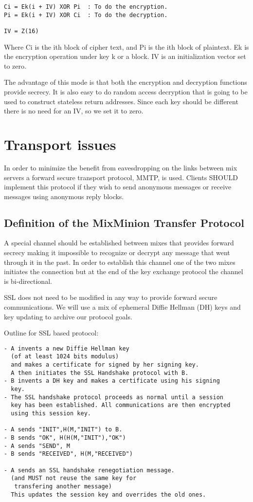 \documentclass{article}
\begin{document}
\begin{verbatim}
Ci = Ek(i + IV) XOR Pi  : To do the encryption.
Pi = Ek(i + IV) XOR Ci  : To do the decryption.

IV = Z(16)
\end{verbatim}

Where Ci is the ith block of cipher text, and Pi is the ith block of
plaintext. Ek is the encryption operation under key k or a block. IV
is an initialization vector set to zero.

The advantage of this mode is that both the encryption and decryption
functions provide secrecy. It is also easy to do random access
decryption that is going to be used to construct stateless return
addresses. Since each key should be different there is no need for an
IV, so we set it to zero. 

\section{Transport issues}

In order to minimize the benefit from eavesdropping on the links 
between mix servers a forward secure transport protocol, MMTP, is used. 
Clients SHOULD implement this protocol if they wish to send anonymous 
messages or receive messages using anonymous reply blocks.

\subsection{Definition of the MixMinion Transfer Protocol}

A special channel should be established between mixes that provides
forward secrecy making it impossible to recognize or decrypt any
message that went through it in the past. In order to establish this
channel one of the two mixes initiates the connection but at the end
of the key exchange protocol the channel is bi-directional.

SSL does not need to be modified in any way to provide forward secure
communications. We will use a mix of ephemeral Diffie Hellman (DH)
keys and key updating to archive our protocol goals.

Outline for SSL based protocol:

\begin{verbatim}
- A invents a new Diffie Hellman key 
  (of at least 1024 bits modulus)
  and makes a certificate for signed by her signing key.
  A then initiates the SSL Handshake protocol with B.
- B invents a DH key and makes a certificate using his signing
  key.
- The SSL handshake protocol proceeds as normal until a session
  key has been established. All communications are then encrypted
  using this session key.

- A sends "INIT",H(M,"INIT") to B.
- B sends "OK", H(H(M,"INIT"),"OK")
- A sends "SEND", M
- B sends "RECEIVED", H(M,"RECEIVED")

- A sends an SSL handshake renegotiation message.
  (and MUST not reuse the same key for 
   transfering another message)
  This updates the session key and overrides the old ones.
\end{verbatim}
\end{document}
